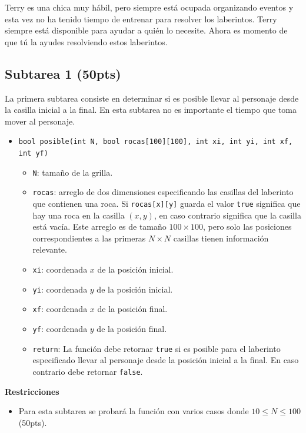 \documentclass{oci}
\begin{document}
\newpage
Terry es una chica muy hábil, pero siempre está ocupada organizando eventos y esta vez no ha tenido tiempo de entrenar para resolver los laberintos.
Terry siempre está disponible para ayudar a quién lo necesite.
Ahora es momento de que tú la ayudes resolviendo estos laberintos.

\subsection*{Subtarea 1 (50pts)}
La primera subtarea consiste en determinar si es posible llevar al personaje desde la casilla inicial a la final.
En esta subtarea no es importante el tiempo que toma mover al personaje.

\begin{itemize}
	\item \verb+bool posible(int N, bool rocas[100][100], int xi, int yi, int xf, int yf)+

  \begin{itemize}
    \item \verb+N+: tamaño de la grilla.
    \item \verb+rocas+: arreglo de dos dimensiones especificando las casillas del laberinto que contienen una roca.
      Si \verb+rocas[x][y]+ guarda el valor \verb+true+ significa que hay una roca en la casilla $(x,y)$, en caso contrario significa que la casilla está vacía.
      Este arreglo es de tamaño $100\times 100$, pero solo las posiciones correspondientes a las primeras $N\times N$ casillas tienen información relevante.
    \item \verb+xi+: coordenada $x$ de la posición inicial.
    \item \verb+yi+: coordenada $y$ de la posición inicial.
    \item \verb+xf+: coordenada $x$ de la posición final.
    \item \verb+yf+: coordenada $y$ de la posición final.
    \item \verb+return+:
      La función debe retornar \verb+true+ si es posible para el laberinto especificado llevar al personaje desde la posición inicial a la final.
      En caso contrario debe retornar \verb+false+.
  \end{itemize}
\end{itemize}
\vspace{-0.6em}

{\bf Restricciones}
\vspace{-1em}
\begin{itemize}
\item Para esta subtarea se probará la función con varios casos donde $10 \leq N\leq 100$ (50pts).
\end{itemize}
\end{document}
